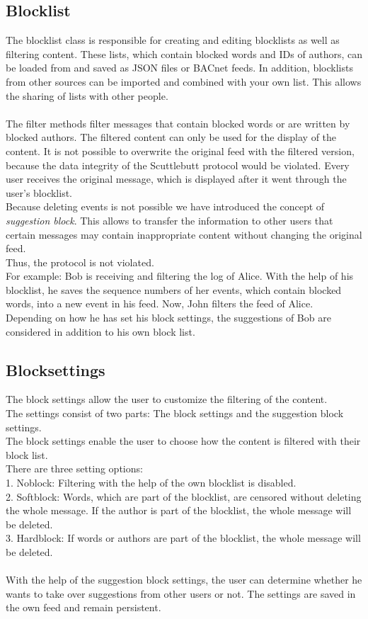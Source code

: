 \documentclass[12pt]{article}
\begin{document}
\subsection{Blocklist}
The blocklist class is responsible for creating and editing blocklists as well as filtering content. 
These lists, which contain blocked words and IDs of authors, can be loaded from and saved as JSON files or BACnet feeds. In addition, blocklists from other sources can be imported and combined with your own list. 
This allows the sharing of lists with other people. \\
\\
The filter methods filter messages that contain blocked words or are written by blocked authors. The filtered content can only be used for the display of the content. It is not possible to overwrite the original feed with the filtered version, because the data integrity of the Scuttlebutt protocol would be violated. Every user receives the original message, which is displayed after it went through the user’s blocklist. \\
Because deleting events is not possible we have introduced the concept of \textit{suggestion block}. This allows to transfer the information to other users that certain messages may contain inappropriate content without changing the original feed.\\ Thus, the protocol is not violated. \\
For example: Bob is receiving and filtering the log of Alice. With the help of his blocklist, he saves the sequence numbers of her events, which contain blocked words, into a new event in his feed. 
Now, John filters the feed of Alice. Depending on how he has set his block settings, the suggestions of Bob are considered in addition to his own block list.

\subsection{Blocksettings}
The block settings allow the user to customize the filtering of the content.\\
The settings consist of two parts: The block settings and the suggestion block settings. \\
The block settings enable the user to choose how the content is filtered with their block list.\\ There are three setting options: \\
1. Noblock: Filtering with the help of the own blocklist is disabled. \\
2. Softblock: Words, which are part of the blocklist, are censored without deleting the whole message. If the author is part of the blocklist, the whole message will be deleted.\\
3. Hardblock: If words or authors are part of the blocklist, the whole message will be deleted.\\
\\
With the help of the suggestion block settings, the user can determine whether he wants to take over suggestions from other users or not. The settings are saved in the own feed and remain persistent.
\end{document}
